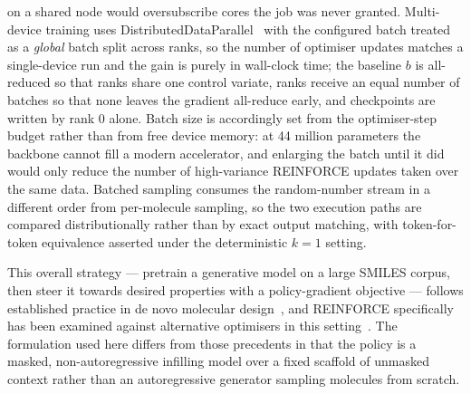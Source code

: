 on a shared node would oversubscribe cores the job was never granted.
Multi-device training uses DistributedDataParallel~\cite{li2020pytorchddp} with
the configured batch treated as a \emph{global} batch split across ranks, so the
number of optimiser updates matches a single-device run and the gain is purely
in wall-clock time; the baseline $b$ is all-reduced so that ranks share one
control variate, ranks receive an equal number of batches so that none leaves
the gradient all-reduce early, and checkpoints are written by rank 0 alone.
Batch size is accordingly set from the optimiser-step budget rather than from
free device memory: at 44 million parameters the backbone cannot fill a modern
accelerator, and enlarging the batch until it did would only reduce the number
of high-variance REINFORCE updates taken over the same data. Batched sampling
consumes the random-number stream in a different order from per-molecule
sampling, so the two execution paths are compared distributionally rather than
by exact output matching, with token-for-token equivalence asserted under the
deterministic $k=1$ setting.

This overall strategy --- pretrain a generative model on a large SMILES
corpus, then steer it towards desired properties with a policy-gradient
objective --- follows established practice in de novo molecular
design~\cite{segler2018focused,olivecrona2017reinvent,popova2018release,guimaraes2017organ,blaschke2020reinvent2},
and REINFORCE specifically has been examined against alternative optimisers in
this setting~\cite{neil2018exploring}. The formulation used here differs from
those precedents in that the policy is a masked, non-autoregressive infilling
model over a fixed scaffold of unmasked context rather than an autoregressive
generator sampling molecules from scratch.

